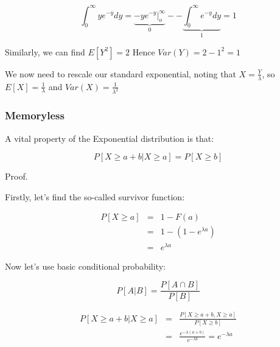 \documentclass[12pt]{extbook}
\begin{document}
\begin{displaymath}
\int_{0}^{\infty} y e^{-y}dy = \underbrace{-ye^{-y}|^{\infty}_o}_{0} - -\underbrace{\int_0^{\infty} e^{-y}dy}_{1} = 1
\end{displaymath}

Similarly, we can find $E[Y^2]=2$   Hence $Var(Y) = 2-1^2=1$


We now need to rescale our standard exponential, noting that $X=\frac{Y}{\lambda}$, so $E[X] = \frac{1}{\lambda}$ and $Var(X)=\frac{1}{\lambda^2}$






\subsubsection{Memoryless}

A vital property of the Exponential distribution is that:

\begin{displaymath}
P[X \geq a+b | X \geq a] = P[X \geq b]
\end{displaymath}

Proof.

Firstly, let's find the so-called survivor function:

\begin{eqnarray*}
P[X \geq a] &=& 1-F(a)\\ 
&=& 1 - (1-e^{\lambda a}) \\
&=& e^{\lambda a}
\end{eqnarray*}


Now let's use basic conditional probability:

\begin{displaymath}
P[A|B] = \frac{P[A \cap B]}{P[B]}
\end{displaymath}


\begin{eqnarray*}
P[X \geq a+b | X \geq a] &=& \frac{P[X \geq a+b, X \geq a]}{P[X \geq b]}\\
&=& \frac{e^{-\lambda(a+b)}}{e^{-\lambda b}} = e^{-\lambda a}
\end{eqnarray*}

\end{document}
